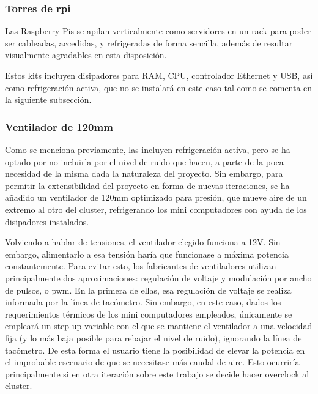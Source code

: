 
\subsubsection{Torres de \acrshort{rpi}}
\label{sssec:torresrpi}
Las Raspberry Pis se apilan verticalmente como servidores en un rack para poder ser cableadas, accedidas, y refrigeradas de forma sencilla, además de resultar visualmente agradables en esta disposición.

Estos kits incluyen disipadores para RAM, CPU, controlador Ethernet y USB, así como refrigeración activa, que no se instalará en este caso tal como se comenta en la siguiente subsección.


\subsubsection{Ventilador de 120mm}
Como se menciona previamente, las  incluyen refrigeración activa, pero se ha optado por no incluirla por el nivel de ruido que hacen, a parte de la poca necesidad de la misma dada la naturaleza del proyecto. Sin embargo, para permitir la extensibilidad del proyecto en forma de nuevas iteraciones, se ha añadido un ventilador de 120mm optimizado para presión, que mueve aire de un extremo al otro del cluster, refrigerando los mini computadores con ayuda de los disipadores instalados.

Volviendo a hablar de tensiones, el ventilador elegido funciona a 12V. Sin embargo, alimentarlo a esa tensión haría que funcionase a máxima potencia constantemente. Para evitar esto, los fabricantes de ventiladores utilizan principalmente dos aproximaciones: regulación de voltaje y modulación por ancho de pulsos, o \acrshort{pwm}. En la primera de ellas, esa regulación de voltaje se realiza informada por la línea de tacómetro. Sin embargo, en este caso,  dados los requerimientos térmicos de los mini computadores empleados, únicamente se empleará un step-up variable con el que se mantiene el ventilador a una velocidad fija (y lo más baja posible para rebajar el nivel de ruido), ignorando la línea de tacómetro. De esta forma el usuario tiene la posibilidad de elevar la potencia en el improbable escenario de que se necesitase más caudal de aire. Esto ocurriría principalmente si en otra iteración sobre este trabajo se decide hacer overclock al cluster.

